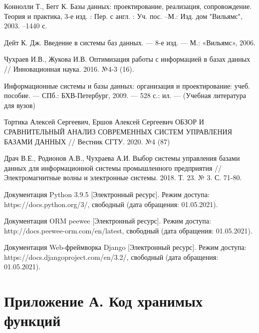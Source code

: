 \documentclass[10pt,a4paper]{report}
\begin{document}
	
	\makeatletter %
	\def\@biblabel#1{#1. }
	\makeatother
	\begin{thebibliography}{9}
		 Коннолли Т., Бегг К. Базы данных: проектирование, реализация, сопровождение. Теория и практика, 3-е изд. : Пер. с англ. : Уч. пос. –М.: Изд. дом "Вильямс", 2003. –1440 с.
		
		 Дейт К. Дж. Введение в системы баз данных. — 8-е изд. — М.:
		«Вильямс», 2006.
		
		 Чухраев И.В., Жукова И.В. Оптимизация работы с информацией в базах данных // Инновационная наука. 2016. №4-3 (16).
		
		 Информационные системы и базы данных: организация и проектирование: учеб. пособие. — СПб.: БХВ-Петербург, 2009. — 528 с.: ил. — (Учебная литература для вузов)
				
		 Тортика Алексей Сергеевич, Ершов Алексей Сергеевич ОБЗОР И СРАВНИТЕЛЬНЫЙ АНАЛИЗ СОВРЕМЕННЫХ СИСТЕМ УПРАВЛЕНИЯ БАЗАМИ ДАННЫХ // Вестник СГТУ. 2020. №4 (87)
		
		 Драч В.Е., Родионов А.В., Чухраева А.И. Выбор системы управления базами данных для информационной системы промышленного предприятия // Электромагнитные волны и электронные системы. 2018. Т. 23. № 3. С. 71-80.
		
		 Документация Python 3.9.5 [Электронный ресурс]. Режим доступа: https://docs.python.org/3/, свободный (дата обращения: 01.05.2021).
		
		 Документация ORM peewee [Электронный ресурс]. Режим доступа:
		 http://docs.peewee-orm.com/en/latest, свободный (дата обращения: 01.05.2021).
		 
 		 Документация Web-фреймворка Django [Электронный ресурс]. Режим доступа: https://docs.djangoproject.com/en/3.2/, свободный (дата обращения: 01.05.2021).
	\end{thebibliography}
	\newpage

	\chapter*{Приложение А. Код хранимых функций}
	\setcounter{chapter}{4}
	\setcounter{lstlisting}{0}
	
\end{document}
